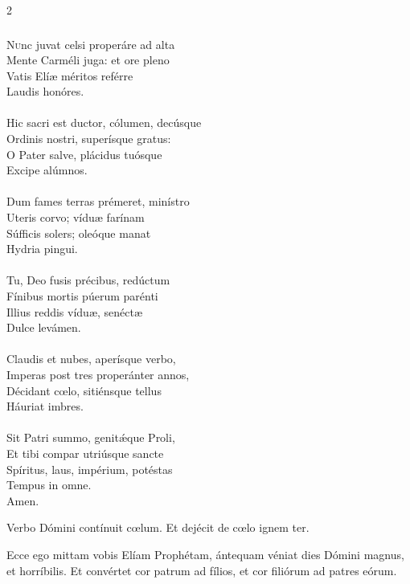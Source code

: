 \documentclass[9pt,twoside]{extarticle}
\begin{document}
\begin{multicols}{2}
\subsubsection*{\center {}}
\lettrine{N}unc juvat celsi properáre ad alta\\
Mente Carméli juga: et ore pleno\\
Vatis Elíæ méritos reférre\\
Laudis honóres.\\
\\
Hic sacri est ductor, cólumen, decúsque\\
Ordinis nostri, superísque gratus:\\
O Pater salve, plácidus tuósque\\
Excipe alúmnos.\\
\\
Dum fames terras prémeret, minístro\\
Uteris corvo; víduæ farínam\\
Súfficis solers; oleóque manat\\
Hydria pingui.\\
\\
Tu, Deo fusis précibus, redúctum\\
Fínibus mortis púerum parénti\\
Illius reddis víduæ, senéctæ\\
Dulce levámen.\\
\\
Claudis et nubes, aperísque verbo,\\
Imperas post tres properánter annos,\\
Décidant cœlo, sitiénsque tellus\\
Háuriat imbres.\\
\\
Sit Patri summo, genitǽque Proli,\\
Et tibi compar utriúsque sancte\\
Spíritus, laus, impérium, potéstas\\
Tempus in omne.\\
Amen.

\begin{tightlist}{}
\item {} Verbo Dómini contínuit cœlum.  Et dejécit de cœlo ignem ter.
\item {} Ecce ego mittam vobis Elíam Prophétam, ántequam véniat dies Dómini magnus, et horríbilis. Et convértet cor patrum ad fílios, et cor filiórum ad patres eórum.
\end{tightlist}


\end{multicols}
\end{document}

